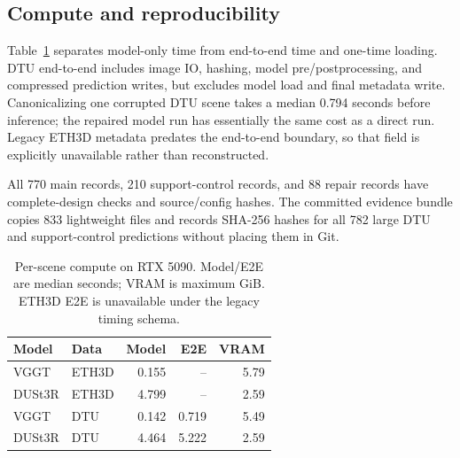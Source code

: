 \subsection{Compute and reproducibility}
Table~\ref{tab:compute} separates model-only time from end-to-end time and
one-time loading.  DTU end-to-end includes image IO, hashing, model
pre/postprocessing, and compressed prediction writes, but excludes model load
and final metadata write.  Canonicalizing one corrupted DTU scene takes a
median 0.794 seconds before inference; the repaired model run has essentially
the same cost as a direct run.  Legacy ETH3D metadata predates the end-to-end
boundary, so that field is explicitly unavailable rather than reconstructed.

All 770 main records, 210 support-control records, and 88 repair records have
complete-design checks and source/config hashes.  The committed evidence bundle
copies 833 lightweight files and records SHA-256 hashes for all 782 large DTU
and support-control predictions without placing them in Git.

\begin{table}[t]
  \centering
  \caption{Per-scene compute on RTX 5090. Model/E2E are median seconds; VRAM is
  maximum GiB. ETH3D E2E is unavailable under the legacy timing schema.}
  \label{tab:compute}
  \setlength{\tabcolsep}{5pt}
  \begin{tabular}{llrrr}
    \toprule
    Model & Data & Model & E2E & VRAM \\
    \midrule
    VGGT   & ETH3D & 0.155 & --    & 5.79 \\
    DUSt3R & ETH3D & 4.799 & --    & 2.59 \\
    VGGT   & DTU   & 0.142 & 0.719 & 5.49 \\
    DUSt3R & DTU   & 4.464 & 5.222 & 2.59 \\
    \bottomrule
  \end{tabular}
\end{table}
